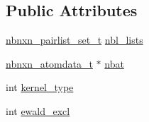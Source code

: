\subsection*{\-Public \-Attributes}
\begin{DoxyCompactItemize}
\item 
\hyperlink{structnbnxn__pairlist__set__t}{nbnxn\-\_\-pairlist\-\_\-set\-\_\-t} \hyperlink{structnonbonded__verlet__group__t_a40b9edc7f55d5572c22965044b594ec3}{nbl\-\_\-lists}
\item 
\hyperlink{structnbnxn__atomdata__t}{nbnxn\-\_\-atomdata\-\_\-t} $\ast$ \hyperlink{structnonbonded__verlet__group__t_ab48c78fa2a0781a8d98452504b9942cc}{nbat}
\item 
int \hyperlink{structnonbonded__verlet__group__t_a5b51907debeee3ec1587b04b7437fa8c}{kernel\-\_\-type}
\item 
int \hyperlink{structnonbonded__verlet__group__t_ab4dd795c4fca642b4b4a4451f5acdbbf}{ewald\-\_\-excl}
\end{DoxyCompactItemize}



